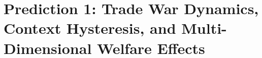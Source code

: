 \section{Prediction 1: Trade War Dynamics, Context Hysteresis, and Multi-Dimensional Welfare Effects}
\label{app:prediction-tradewar}


\begin{abstract}
This appendix provides the complete technical foundation for Prediction 1 of the 
Complementarity-Context Framework: that trade wars produce persistent welfare effects 
through context ($\Psi$) shifts that outlast the tariffs themselves. We develop the 
formal model, derive quantitative predictions using the $\Gamma$-matrix, present 
empirical validation from the 2018--2025 US-China trade conflict, and establish 
falsification criteria. The analysis demonstrates how the framework generates 
novel, testable predictions unavailable to standard trade theory.
\end{abstract}


